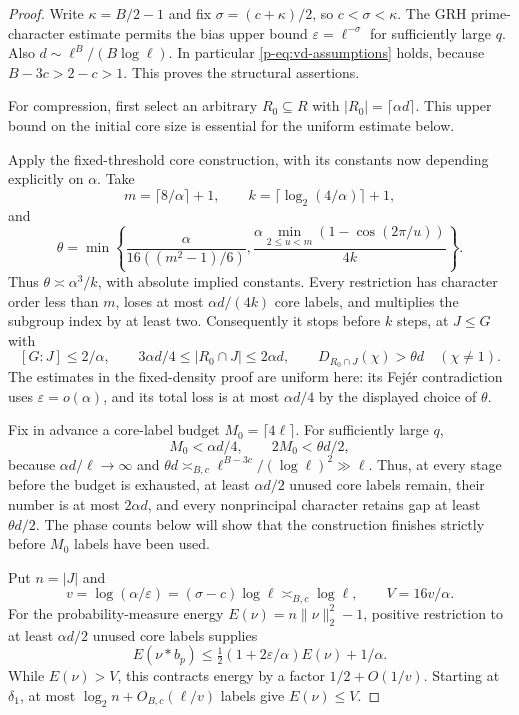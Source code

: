 \documentclass[11pt,a4paper]{article}
\theoremstyle{definition}
\theoremstyle{remark}
\begin{document}
\begin{proof}
Write $\kappa=B/2-1$ and fix
$\sigma=(c+\kappa)/2$, so $c<\sigma<\kappa$.
The GRH prime-character estimate permits the bias upper bound
$\varepsilon=\ell^{-\sigma}$ for sufficiently large $q$.
Also $d\sim\ell^B/(B\log\ell)$.
In particular \eqref{p-eq:vd-assumptions} holds, because
$B-3c>2-c>1$. This proves the structural assertions.

For compression, first select an arbitrary $R_0\subseteq R$ with
$|R_0|=\lceil\alpha d\rceil$. This upper bound on the initial core
size is essential for the uniform estimate below.

Apply the fixed-threshold core construction, with its constants now
depending explicitly on $\alpha$. Take
\[
 m=\lceil8/\alpha\rceil+1,\qquad
 k=\lceil\log_2(4/\alpha)\rceil+1,
\]
and
\[
 \theta=\min\left\{
 \frac{\alpha}{16((m^2-1)/6)},
 \frac{\alpha\min_{2\leq u<m}(1-\cos(2\pi/u))}{4k}
 \right\}.
\]
Thus $\theta\asymp\alpha^3/k$, with absolute implied constants.
Every restriction has character order less than $m$, loses at most
$\alpha d/(4k)$ core labels, and multiplies the subgroup index by at
least two. Consequently it stops before $k$ steps, at $J\leq G$ with
\begin{equation}\label{p-eq:vd-core-bounds}
 [G:J]\leq2/\alpha,
 \qquad 3\alpha d/4\leq|R_0\cap J|\leq2\alpha d,
 \qquad
 D_{R_0\cap J}(\chi)>\theta d
 \quad(\chi\ne1).
\end{equation}
The estimates in the fixed-density proof are uniform here: its Fej\'er
contradiction uses $\varepsilon=o(\alpha)$, and its total loss is at
most $\alpha d/4$ by the displayed choice of $\theta$.

Fix in advance a core-label budget $M_0=\lceil4\ell\rceil$.
For sufficiently large $q$,
\[
 M_0<\alpha d/4,\qquad 2M_0<\theta d/2,
\]
because $\alpha d/\ell\to\infty$ and
$\theta d\asymp_{B,c}\ell^{B-3c}/(\log\ell)^2\gg\ell$.
Thus, at every stage before the budget is exhausted, at least
$\alpha d/2$ unused core labels remain, their number is at most
$2\alpha d$, and every nonprincipal character retains gap at least
$\theta d/2$. The phase counts below will show that the construction
finishes strictly before $M_0$ labels have been used.

Put $n=|J|$ and
\[
 v=\log(\alpha/\varepsilon)
   =(\sigma-c)\log\ell\asymp_{B,c}\log\ell,
 \qquad V=16v/\alpha.
\]
For the probability-measure energy $E(\nu)=n\|\nu\|_2^2-1$, positive
restriction to at least $\alpha d/2$ unused core labels supplies
\[
 E(\nu*b_p)\leq\tfrac12(1+2\varepsilon/\alpha)E(\nu)+1/\alpha.
\]
While $E(\nu)>V$, this contracts energy by a factor
$1/2+O(1/v)$. Starting at $\delta_1$, at most
$\log_2n+O_{B,c}(\ell/v)$ labels give $E(\nu)\leq V$.


\end{proof}
\end{document}
